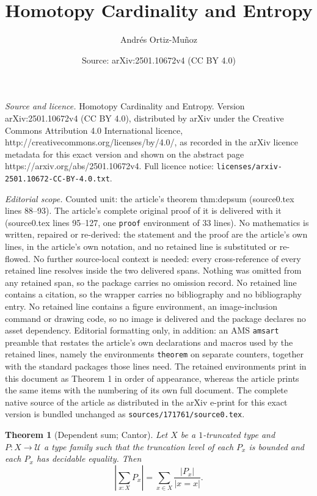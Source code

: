 \documentclass[10pt,a4paper]{amsart}
\title{Homotopy Cardinality and Entropy}
\author{Andr\'es Ortiz-Mu\~noz}
\date{Source: arXiv:2501.10672v4 (CC BY 4.0)}
\newtheorem{theorem}{Theorem}
\newcommand{\U}{\mathcal{U}}
\begin{document}
\maketitle

\noindent\emph{Source and licence.} Homotopy Cardinality and Entropy. Version arXiv:2501.10672v4 (CC BY 4.0), distributed by arXiv under the Creative Commons Attribution 4.0 International licence, http://creativecommons.org/licenses/by/4.0/, as recorded in the arXiv licence metadata for this exact version and shown on the abstract page https://arxiv.org/abs/2501.10672v4. Full licence notice: \texttt{licenses/arxiv-2501.10672-CC-BY-4.0.txt}.\par\smallskip

\noindent\textit{Editorial scope.} Counted unit: the article's theorem thm:depsum (source0.tex lines 88--93). The article's complete original proof of it is delivered with it (source0.tex lines 95--127, one \texttt{proof} environment of 33 lines). No mathematics is written, repaired or re-derived: the statement and the proof are the article's own lines, in the article's own notation, and no retained line is substituted or re-flowed.  No further source-local context is needed: every cross-reference of every retained line resolves inside the two delivered spans.  Nothing was omitted from any retained span, so the package carries no omission record.  No retained line contains a citation, so the wrapper carries no bibliography and no bibliography entry.  No retained line contains a figure environment, an image-inclusion command or drawing code, so no image is delivered and the package declares no asset dependency.  Editorial formatting only, in addition: an AMS \texttt{amsart} preamble that restates the article's own declarations and macros used by the retained lines, namely the environments \texttt{theorem} on separate counters, together with the standard packages those lines need.  The retained environments print in this document as Theorem 1 in order of appearance, whereas the article prints the same items with the numbering of its own full document.  The complete native source of the article as distributed in the arXiv e-print for this exact version is bundled unchanged as \texttt{sources/171761/source0.tex}.
\begin{theorem}[Dependent sum; Cantor]\label{thm:depsum}
Let $X$ be a $1$-truncated type and $P:X\to\U$ a type family such that the truncation level of each $P_x$ is bounded and each $P_x$ has decidable equality. Then
\[
\left|\sum_{x:X}P_x\right| = \sum_{x\in X}\frac{|P_x|}{|x=x|}.
\]
\end{theorem}
\end{document}
